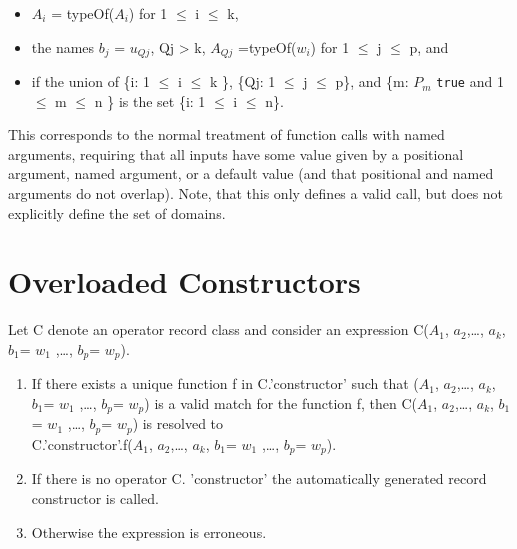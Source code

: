 \begin{itemize}
\item
  $A_{i}$ = typeOf($A_{i}$) for 1 $\le$ i $\le$ k,
\item
  the names $b_{j}$ = $u_{Qj}$, Qj \textgreater{}
  k, $A_{Qj}$ =typeOf($w_{i}$) for 1 $\le$ j $\le$ p, and
\item
  if the union of \{i: 1 $\le$ i $\le$ k \}, \{Qj: 1 $\le$ j $\le$ p\}, and \{m:
  $P_{m}$ \lstinline!true! and 1 $\le$ m $\le$ n \} is the set \{i: 1 $\le$
  i $\le$ n\}.
\end{itemize}

\begin{nonnormative}
This corresponds to the normal treatment of function calls with
named arguments, requiring that all inputs have some value given by a
positional argument, named argument, or a default value (and that
positional and named arguments do not overlap). Note, that this only
defines a valid call, but does not explicitly define the set of
domains.
\end{nonnormative}

\section{Overloaded Constructors}

Let C denote an operator record class and consider an expression
C($A_1$, $a_{2}$,\ldots{}, $a_{k}$,
$b_{1}$= $w_{1}$ ,\ldots{}, $b_{p}$=
$w_{p}$).

\begin{enumerate}
\item
  If there exists a {unique} function f in C.'constructor' such that
  ($A_1$, $a_{2}$,\ldots{}, $a_{k}$,
  $b_{1}$= $w_{1}$ ,\ldots{}, $b_{p}$=
  $w_{p}$) is a valid match for the function f, then
  C($A_1$, $a_{2}$,\ldots{}, $a_{k}$,
  $b_{1}$= $w_{1}$ ,\ldots{}, $b_{p}$=
  $w_{p}$) is resolved to\\
  C.'constructor'.f($A_1$, $a_{2}$,\ldots{},
  $a_{k}$, $b_{1}$= $w_{1}$ ,\ldots{},
  $b_{p}$= $w_{p}$).
\item
  If there is no operator C. 'constructor' the automatically generated
  record constructor is called.
\item
  Otherwise the expression is erroneous.
\end{enumerate}

